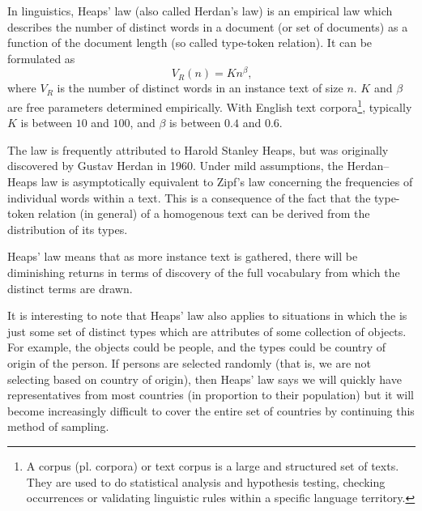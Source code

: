     In linguistics, Heaps' law (also called Herdan's law) is an empirical law which describes the number of distinct words in a document (or set of documents) as a function of the document length (so called type-token relation). It can be formulated as
    \begin{equation}
      V_R(n) = Kn^\beta\mbox{,}
    \end{equation}
    where $V_R$ is the number of distinct words in an instance text of size $n$. $K$ and $\beta$ are free parameters determined empirically. With English text corpora\footnote{A corpus (pl. corpora) or text corpus is a large and structured set of texts. They are used to do statistical analysis and hypothesis testing, checking occurrences or validating linguistic rules within a specific language territory.}, typically $K$ is between $10$ and $100$, and $\beta$ is between $0.4$ and $0.6$.

    The law is frequently attributed to Harold Stanley Heaps, but was originally discovered by Gustav Herdan in 1960.\cite{Egghe2007} Under mild assumptions, the Herdan–Heaps law is asymptotically equivalent to Zipf's law concerning the frequencies of individual words within a text.\cite{Kornai1999} This is a consequence of the fact that the type-token relation (in general) of a homogenous text can be derived from the distribution of its types.\cite{Milicka2009}

    Heaps' law means that as more instance text is gathered, there will be diminishing returns in terms of discovery of the full vocabulary from which the distinct terms are drawn.

    It is interesting to note that Heaps' law also applies to situations in which the  is just some set of distinct types which are attributes of some collection of objects. For example, the objects could be people, and the types could be country of origin of the person. If persons are selected randomly (that is, we are not selecting based on country of origin), then Heaps' law says we will quickly have representatives from most countries (in proportion to their population) but it will become increasingly difficult to cover the entire set of countries by continuing this method of sampling.